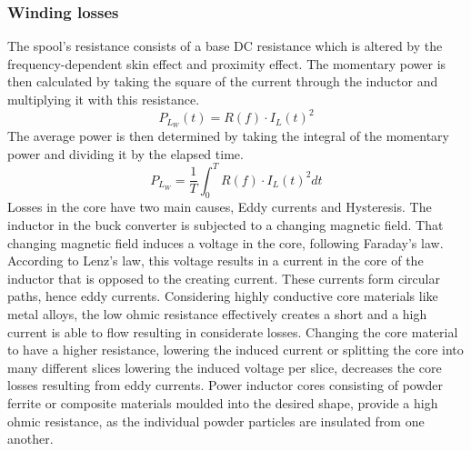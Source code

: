 \subsubsection{Winding losses}
The spool's resistance consists of a base DC resistance which is altered by the frequency-dependent skin effect and proximity effect. The momentary power is then calculated by taking the square of the current through the inductor and multiplying it with this resistance. 
\begin{equation}
    P_{L_{W}}(t) = R(f) \cdot I_L(t)^2
\end{equation}
The average power is then determined by taking the integral of the momentary power and dividing it by the elapsed time.
\begin{equation}
    P_{L_{W}} = \frac{1}{T} \int_{0}^{T} R(f) \cdot I_L(t)^2 dt    
\end{equation}
Losses in the core have two main causes, Eddy currents and Hysteresis. The inductor in the buck converter is subjected to a changing magnetic field. That changing magnetic field induces a voltage in the core, following Faraday's law. According to Lenz's law, this voltage results in a current in the core of the inductor that is opposed to the creating current. These currents form circular paths, hence eddy currents. Considering highly conductive core materials like metal alloys, the low ohmic resistance effectively creates a short and a high current is able to flow resulting in considerate losses. Changing the core material to have a higher resistance, lowering the induced current or splitting the core into many different slices lowering the induced voltage per slice, decreases the core losses resulting from eddy currents. Power inductor cores consisting of powder ferrite or composite materials moulded into the desired shape, provide a high ohmic resistance, as the individual powder particles are insulated from one another.

